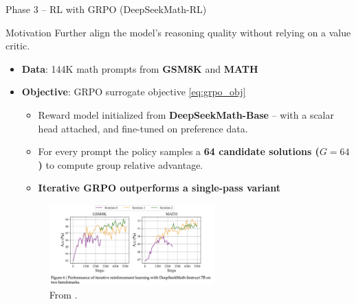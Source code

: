 \documentclass[9pt]{beamer}
\begin{document}
\begin{frame}{Phase 3 – RL with GRPO (DeepSeekMath-RL)}
  \begin{block}{Motivation}
    Further align the model’s reasoning quality without relying on a value critic.
  \end{block}

  \begin{itemize}
    \item \textbf{Data}: 144K math prompts from \textbf{GSM8K} and \textbf{MATH}

        \vspace{0.8em}
    \pause
    \item \textbf{Objective}: GRPO surrogate objective \eqref{eq:grpo_obj}
      \begin{itemize}
        \pause
        \item Reward model initialized from \textbf{DeepSeekMath-Base} -- with a scalar head attached, and fine-tuned on preference data.
        \pause
        \item For every prompt the policy samples a \textbf{64 candidate solutions ($G=64$)} to compute group relative advantage.
        \pause
        \item \textbf{Iterative GRPO outperforms a single-pass variant}
      \end{itemize}

        \vspace{0.8em}
      \begin{figure}
        \centering
        \includegraphics[width=0.6\textwidth]{figures/iterative.png}
        \caption{From \cite{shao2024deepseekmathpushinglimitsmathematical}.}
        \label{fig:trl4}
      \end{figure}
  \end{itemize}
\end{frame}
\end{document}
